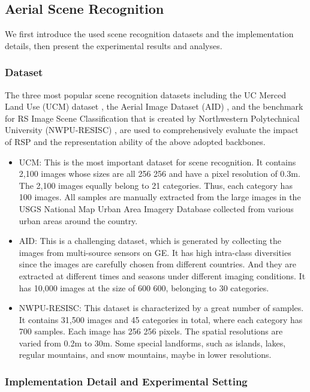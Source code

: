 \documentclass[10pt, journal,twoside]{IEEEtran}
\begin{document}
\subsection{Aerial Scene Recognition}

We first introduce the used scene recognition datasets and the implementation details, then present the experimental results and analyses.

\subsubsection{Dataset}

The three most popular scene recognition datasets including the UC Merced Land Use (UCM) dataset \cite{ucm}, the Aerial Image Dataset (AID) \cite{aid}, and the benchmark for RS Image Scene Classification that is created by Northwestern Polytechnical University (NWPU-RESISC) \cite{asr_review}, are used to comprehensively evaluate the impact of RSP and the representation ability of the above adopted backbones.

\begin{itemize}
  \item UCM: This is the most important dataset for scene recognition. It contains 2,100 images whose sizes are all 256  256 and have a pixel resolution of 0.3m. The 2,100 images equally belong to 21 categories. Thus, each category has 100 images. All samples are manually extracted from the large images in the USGS National Map Urban Area Imagery Database collected from various urban areas around the country.
  \item AID: This is a challenging dataset, which is generated by collecting the images from multi-source sensors on GE. It has high intra-class diversities since the images are carefully chosen from different countries. And they are extracted at different times and seasons under different imaging conditions. It has 10,000 images at the size of 600  600, belonging to 30 categories.
  \item NWPU-RESISC: This dataset is characterized by a great number of samples. It contains 31,500 images and 45 categories in total, where each category has 700 samples. Each image has 256  256 pixels. The spatial resolutions are varied from 0.2m to 30m. Some special landforms, such as islands, lakes, regular mountains, and snow mountains, maybe in lower resolutions.
\end{itemize}

\subsubsection{Implementation Detail and Experimental Setting}
\end{document}
